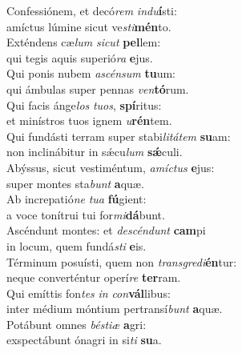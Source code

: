 \evenverse Confessiónem, et decó\textit{rem} \textit{in}\textit{du}\textbf{í}sti:~\*\\
\evenverse amíctus lúmine sicut ve\textit{sti}\textbf{mén}to.\\
\oddverse Exténdens cæ\textit{lum} \textit{si}\textit{cut} \textbf{pel}lem:~\*\\
\oddverse qui tegis aquis superió\textit{ra} \textbf{e}jus.\\
\evenverse Qui ponis nubem \textit{a}\textit{scén}\textit{sum} \textbf{tu}um:~\*\\
\evenverse qui ámbulas super pennas \textit{ven}\textbf{tó}rum.\\
\oddverse Qui facis ánge\textit{los} \textit{tu}\textit{os}, \textbf{spí}ritus:~\*\\
\oddverse et minístros tuos ignem \textit{u}\textbf{rén}tem.\\
\evenverse Qui fundásti terram super stabi\textit{li}\textit{tá}\textit{tem} \textbf{su}am:~\*\\
\evenverse non inclinábitur in sǽcu\textit{lum} \textbf{sǽ}culi.\\
\oddverse Abýssus, sicut vestiméntum, \textit{a}\textit{mí}\textit{ctus} \textbf{e}jus:~\*\\
\oddverse super montes sta\textit{bunt} \textbf{a}quæ.\\
\evenverse Ab increpatió\textit{ne} \textit{tu}\textit{a} \textbf{fú}gient:~\*\\
\evenverse a voce tonítrui tui for\textit{mi}\textbf{dá}bunt.\\
\oddverse Ascéndunt montes: et \textit{de}\textit{scén}\textit{dunt} \textbf{cam}pi~\*\\
\oddverse in locum, quem fundá\textit{sti} \textbf{e}is.\\
\evenverse Términum posuísti, quem non \textit{tran}\textit{sgre}\textit{di}\textbf{én}tur:~\*\\
\evenverse neque converténtur operí\textit{re} \textbf{ter}ram.\\
\oddverse Qui emíttis fon\textit{tes} \textit{in} \textit{con}\textbf{vál}libus:~\*\\
\oddverse inter médium móntium pertransí\textit{bunt} \textbf{a}quæ.\\
\evenverse Potábunt omnes \textit{bé}\textit{sti}\textit{æ} \textbf{a}gri:~\*\\
\evenverse exspectábunt ónagri in si\textit{ti} \textbf{su}a.\\
